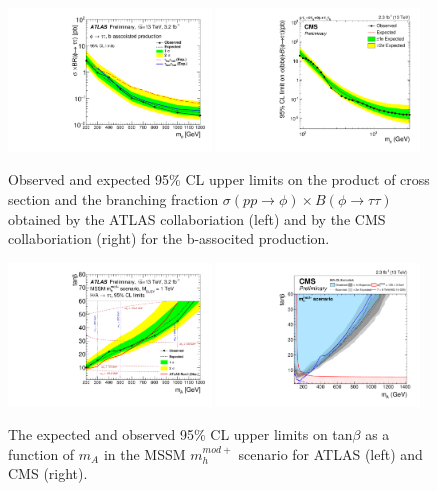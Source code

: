 \begin{figure}
\centering
\includegraphics[width=0.48\textwidth, angle=0] {figures/fig_2Htautau_b.pdf}
\includegraphics[width=0.48\textwidth, angle=0] {figures/fig_2Htautau_d.pdf}
\caption{ Observed and expected 95\% CL upper limits on the product of cross section and the branching fraction $\sigma(pp\rightarrow \phi) \times B(\phi\rightarrow \tau\tau)$ obtained by the ATLAS collaboriation (left) and by the CMS collaboriation (right) for the b-associted production.}
\label{fig_2bHtautau}   
\end{figure}

\begin{figure}[tbh!]
\centering
\includegraphics[width=0.48\textwidth, angle=0] {figures/fig_3Htautau_a.pdf}
\includegraphics[width=0.48\textwidth, angle=0] {figures/fig_3Htautau_b.pdf}
\caption{ The expected and observed 95\% CL upper limits on tan$\beta$ as a function of $m_{A}$ in the MSSM $m_{h}^{mod+}$ scenario for ATLAS (left) and CMS (right).}
\label{fig_3Htautau}   
\end{figure}

